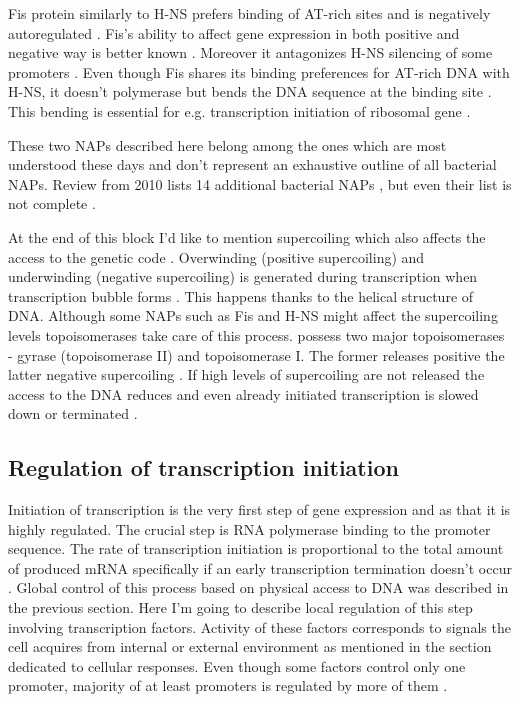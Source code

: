 Fis protein similarly to H-NS prefers binding of AT-rich sites and is negatively autoregulated \cite{ball1992dramatic, stella2010shape}.
Fis's ability to affect gene expression in both positive and negative way is better known \cite{choi2005effects, karambelkar2012silencing}.
Moreover it antagonizes H-NS silencing of some promoters \cite{falconi2001involvement}.
Even though Fis shares its binding preferences for AT-rich DNA with H-NS, it doesn't polymerase but bends the DNA sequence at the binding site \cite{hubner1989bent}.
This bending is essential for e.g. transcription initiation of ribosomal gene  \cite{gosink1993dna}.

These two NAPs described here belong among the ones which are most understood these days and don't represent an exhaustive outline of all bacterial NAPs.
Review from 2010 lists 14 additional bacterial NAPs \cite{dillon2010bacterial}, but even their list is not complete \cite{aznar2013hha}.

At the end of this block I'd like to mention supercoiling which also affects the access to the genetic code \cite{brahms1985activation}.
Overwinding (positive supercoiling) and underwinding (negative supercoiling) is generated during transcription when transcription bubble forms \cite{wu1988transcription}.
This happens thanks to the helical structure of DNA.
Although some NAPs such as Fis and H-NS might affect the supercoiling levels \cite{ouafa2012nucleoid} topoisomerases take care of this process.
 possess two major topoisomerases - gyrase (topoisomerase II) and topoisomerase I.
The former releases positive the latter negative supercoiling \cite{wang1971interaction, gellert1976dna}.
If high levels of supercoiling are not released the access to the DNA reduces and even already initiated transcription is slowed down or terminated \cite{chong2014mechanism}.

\subsection{Regulation of transcription initiation}
Initiation of transcription is the very first step of gene expression and as that it is highly regulated.
The crucial step is RNA polymerase binding to the promoter sequence.
The rate of transcription initiation is proportional to the total amount of produced mRNA specifically if an early transcription termination doesn't occur \cite{kennell1977transcription, iyer1996absolute}.
Global control of this process based on physical access to DNA was described in the previous section.
Here I'm going to describe local regulation of this step involving transcription factors.
Activity of these factors corresponds to signals the cell acquires from internal or external environment as mentioned in the section dedicated to cellular responses.
Even though some factors control only one promoter, majority of at least  promoters is regulated by more of them \cite{karp2014ecocyc}.

